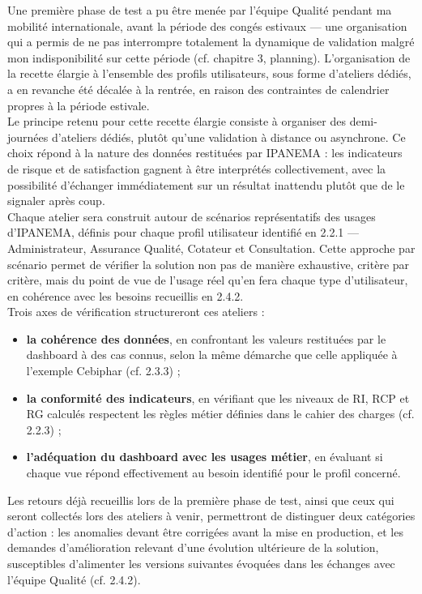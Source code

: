 Une première phase de test a pu être menée par l'équipe Qualité pendant ma mobilité 
internationale, avant la période des congés estivaux — une organisation qui a permis de ne 
pas interrompre totalement la dynamique de validation malgré mon indisponibilité sur cette 
période (cf. chapitre 3, planning). L'organisation de la recette élargie à l'ensemble des profils 
utilisateurs, sous forme d'ateliers dédiés, a en revanche été décalée à la rentrée, en raison 
des contraintes de calendrier propres à la période estivale. \\

Le principe retenu pour cette recette élargie consiste à organiser des demi-journées d'ateliers 
dédiés, plutôt qu'une validation à distance ou asynchrone. Ce choix répond à la nature des 
données restituées par IPANEMA : les indicateurs de risque et de satisfaction gagnent à être 
interprétés collectivement, avec la possibilité d'échanger immédiatement sur un résultat 
inattendu plutôt que de le signaler après coup. \\

Chaque atelier sera construit autour de scénarios représentatifs des usages d'IPANEMA, 
définis pour chaque profil utilisateur identifié en 2.2.1 — Administrateur, Assurance Qualité, 
Cotateur et Consultation. Cette approche par scénario permet de vérifier la solution non pas 
de manière exhaustive, critère par critère, mais du point de vue de l'usage réel qu'en fera 
chaque type d'utilisateur, en cohérence avec les besoins recueillis en 2.4.2. 
\\
Trois axes de vérification structureront ces ateliers :

\begin{itemize}[label=\textbullet, leftmargin=*]
    \item \textbf{la cohérence des données}, en confrontant les valeurs restituées par le dashboard à des cas connus, selon la même démarche que celle appliquée à l'exemple Cebiphar (cf. 2.3.3) ;
    \item \textbf{la conformité des indicateurs}, en vérifiant que les niveaux de RI, RCP et RG calculés respectent les règles métier définies dans le cahier des charges (cf. 2.2.3) ;
    \item \textbf{l'adéquation du dashboard avec les usages métier}, en évaluant si chaque vue répond effectivement au besoin identifié pour le profil concerné.
\end{itemize}

Les retours déjà recueillis lors de la première phase de test, ainsi que ceux qui seront collectés 
lors des ateliers à venir, permettront de distinguer deux catégories d'action : les anomalies 
devant être corrigées avant la mise en production, et les demandes d'amélioration relevant 
d'une évolution ultérieure de la solution, susceptibles d'alimenter les versions suivantes 
évoquées dans les échanges avec l'équipe Qualité (cf. 2.4.2). \\

